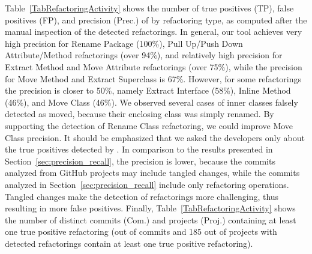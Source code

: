 Table~\ref{TabRefactoringActivity} shows the number of true positives (TP), false positives (FP), and precision (Prec.) of \toolName by refactoring type,
as computed after the manual inspection of the detected refactorings.
In general, our tool achieves very high precision for {\textsc Rename Package} (100\%), {\textsc Pull Up/Push Down Attribute/Method} refactorings (over 94\%),
and relatively high precision for {\textsc Extract Method} and {\textsc Move Attribute} refactorings (over 75\%),
while the precision for {\textsc Move Method} and {\textsc Extract Superclass} is 67\%.
However, for some refactorings the precision is closer to 50\%, namely {\textsc Extract Interface} (58\%), {\textsc Inline Method} (46\%),
and {\textsc Move Class} (46\%).
We observed several cases of inner classes falsely detected as moved, because their enclosing class was simply renamed.
By supporting the detection of {\textsc Rename Class} refactoring, we could improve {\textsc Move Class} precision.
It should be emphasized that we asked the developers only about the true positives detected by \toolName.
In comparison to the results presented in Section~\ref{sec:precision_recall}, the precision is lower,
because the commits analyzed from GitHub projects may include tangled changes, while the commits analyzed in Section~\ref{sec:precision_recall} include only refactoring operations.
Tangled changes make the detection of refactorings more challenging, thus resulting in more false positives.
Finally, Table~\ref{TabRefactoringActivity} shows the number of distinct commits (Com.) and projects (Proj.) 
containing at least one true positive refactoring
(\commitsWithTruePositiveRefactoring out of \commitsWithDetectedRefactoring commits and 185 out of  projects with detected refactorings contain at least one true positive refactoring).

